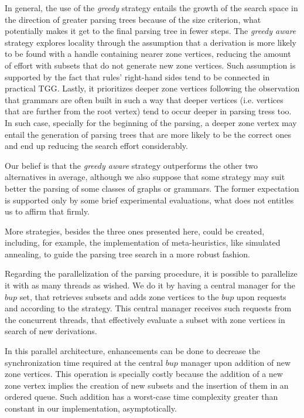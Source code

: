 In general, the use of the \emph{greedy} strategy entails the growth of the search space in the direction of greater parsing trees because of the size criterion, what potentially makes it get to the final parsing tree in fewer steps. The \emph{greedy aware} strategy explores locality through the assumption that a derivation is more likely to be found with a handle containing nearer zone vertices, reducing the amount of effort with subsets that do not generate new zone vertices. Such assumption is supported by the fact that rules' right-hand sides tend to be connected in practical TGG. Lastly, it prioritizes deeper zone vertices following the observation that grammars are often built in such a way that deeper vertices (i.e. vertices that are further from the root vertex) tend to occur deeper in parsing tress too. In such case, specially for the beginning of the parsing, a deeper zone vertex may entail the generation of parsing trees that are more likely to be the correct ones and end up reducing the search effort considerably.

Our belief is that the \emph{greedy aware} strategy outperforms the other two alternatives in average, although we also suppose that some strategy may suit better the parsing of some classes of graphs or grammars. The former expectation is supported only by some brief experimental evaluations, what does not entitles us to affirm that firmly.

More strategies, besides the three ones presented here, could be created, including, for example, the implementation of meta-heuristics, like simulated annealing, to guide the parsing tree search in a more robust fashion.

Regarding the parallelization of the parsing procedure, it is possible to parallelize it with as many threads as wished. We do it by having a central manager for the $bup$ set, that retrieves subsets and adds zone vertices to the $bup$ upon requests and according to the strategy. This central manager receives such requests from the concurrent threads, that effectively evaluate a subset with zone vertices in search of new derivations.

In this parallel architecture, enhancements can be done to decrease the synchronization time required at the central $bup$ manager upon addition of new zone vertices. This operation is specially costly because the addition of a new zone vertex implies the creation of new subsets and the insertion of them in an ordered queue. Such addition has a worst-case time complexity greater than constant in our implementation, asymptotically.


